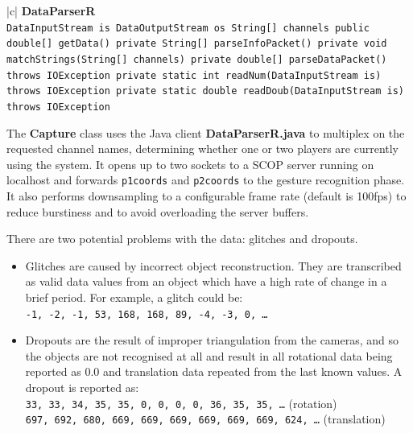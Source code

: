 \documentclass[12pt,a4,notitlepage]{report}
\renewcommand{\_}{\texttt{\symbol{95}}}
\newcommand{\<}{\texttt{\symbol{60}}}
\renewcommand{\>}{\texttt{\symbol{62}}}
\newcommand{\class}[1]{\textbf{#1}}
\newcommand{\scopendpoint}[1]{\texttt{#1}}
\newcommand{\variable}[1]{\texttt{#1}}
\begin{document}
\begin{tabular}{|c|} \hline 
\class{DataParserR} \\ \hline
{}
{ \variable{DataInputStream is \newline
DataOutputStream os \newline
String[] channels \newline
public double[] getData() \newline
private String[] parseInfoPacket() \newline
private void matchStrings(String[] channels) \newline
private double[] parseDataPacket() throws IOException \newline
private static int readNum(DataInputStream is) throws IOException \newline
private static double readDoub(DataInputStream is) throws IOException
} } \\ \hline
\end{tabular}

The \class{Capture} class uses the Java client \class{DataParserR.java} to multiplex on the requested channel names, determining whether one or two players are currently using the system. It opens up to two sockets to a SCOP server running on localhost and forwards \scopendpoint{p1coords} and \scopendpoint{p2coords} to the gesture recognition phase. It also performs downsampling to a configurable frame rate (default is 100fps) to reduce burstiness and to avoid overloading the server buffers.

There are two potential problems with the data: glitches and dropouts. 
\begin{itemize}
\item Glitches are caused by incorrect object reconstruction. They are transcribed as valid data values from an object which have a high rate of change in a brief period. For example, a glitch could be: \\
\texttt{-1, -2, -1, 53, 168, 168, 89, -4, -3, 0, \ldots}

\item Dropouts are the result of improper triangulation from the cameras, and so the objects are not recognised at all and result in all rotational data being reported as 0.0 and translation data repeated from the last known values. A dropout is reported as: \\
\texttt{33, 33, 34, 35, 35, 0, 0, 0, 0, 36, 35, 35, \ldots} (rotation) \\
\texttt{697, 692, 680, 669, 669, 669, 669, 669, 669, 624, \ldots} (translation)
\end{itemize}
\end{document}
